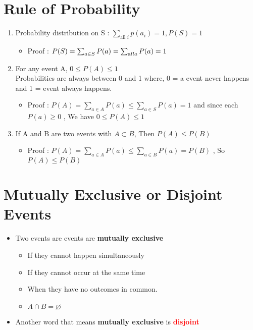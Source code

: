 \documentclass{article}
\begin{document}
\section{Rule of Probability}
\begin{enumerate}
\item Probability distribution on S : \(\sum_{\text{all } i} p(a_i) = 1, P(S) = 1 \)
\begin{itemize}
\item Proof : \(P(S) = \sum_{a \in S} P(a) = \sum_{\text all a} P (a) = 1\)
\end{itemize}

\item For any event A, \(0 \leq P(A) \leq 1\) \\
Probabilities are always between 0 and 1 where, 0 = a event never happens and 1 = event always happens.
\begin{itemize}
\item Proof : \(P(A) = \sum_{a \in A} P(a) \leq \sum_{a \in S} P(a) = 1\) and since each  \(P(a) \geq 0\) , We have \(0 \leq P(A) \leq 1\)
\end{itemize}

\item If A and B are two events with \(A \subset B\), Then \(P(A) \leq P(B)\)
\begin{itemize}
\item Proof : \(P(A) = \sum_{a \in A} P(a) \leq \sum_{a \in B} P(a) =  P(B)\) , So \(P(A) \leq P(B)\)
\end{itemize}
\end{enumerate}

\section{Mutually Exclusive or Disjoint Events} 
\begin{itemize}
\item Two events are events are \textbf{mutually exclusive}
\begin{itemize}
\item If they cannot happen simultaneously
\item If they cannot occur at the same time 
\item When they have no outcomes in common. 
\item \(A \cap B = \varnothing \)
\end{itemize}
\item Another word that means \textbf{mutually exclusive} is \textcolor{red}{\textbf{disjoint}}
\end{itemize}
\end{document}
